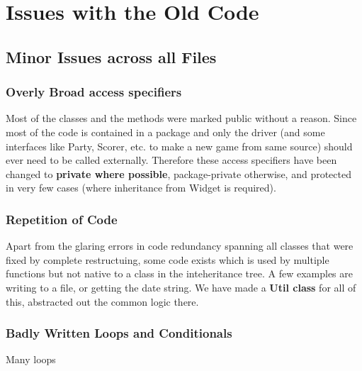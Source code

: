 \section{Issues with the Old Code}


\subsection{Minor Issues across all Files}

\subsubsection{Overly Broad access specifiers}

Most of the classes and the methods were marked public without a reason. Since most of the code is contained in a package and only the driver (and some interfaces like Party, Scorer, etc. to make a new game from same source) should ever need to be called externally. Therefore these access specifiers have been changed to \textbf{private where possible}, package-private otherwise, and protected in very few cases (where inheritance from Widget is required).

\subsubsection{Repetition of Code}

Apart from the glaring errors in code redundancy spanning all classes that were fixed by complete restructuing, some code exists which is used by multiple functions but not native to a class in the inteheritance tree. A few examples are writing to a file, or getting the date string. We have made a \textbf{Util class} for all of this, abstracted out the common logic there.

\subsubsection{Badly Written Loops and Conditionals}

Many loops